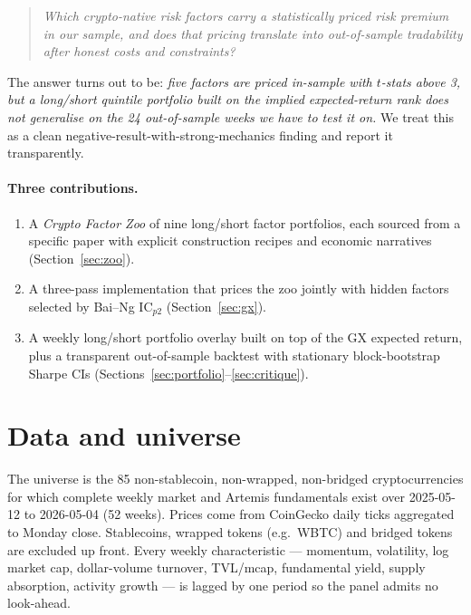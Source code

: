 \documentclass[11pt,a4paper]{article}
\begin{document}
\begin{quote}
\emph{Which crypto-native risk factors carry a statistically priced risk premium in our sample, and does that pricing translate into out-of-sample tradability after honest costs and constraints?}
\end{quote}

The answer turns out to be: \emph{five factors are priced in-sample with $t$-stats above 3, but a long/short quintile portfolio built on the implied expected-return rank does not generalise on the 24 out-of-sample weeks we have to test it on.} We treat this as a clean negative-result-with-strong-mechanics finding and report it transparently.

\paragraph{Three contributions.}
\begin{enumerate}[topsep=2pt,itemsep=0pt]
\item A \emph{Crypto Factor Zoo} of nine long/short factor portfolios, each sourced from a specific paper with explicit construction recipes and economic narratives (Section~\ref{sec:zoo}).
\item A \citet{giglioxiu2021} three-pass implementation that prices the zoo jointly with hidden factors selected by Bai--Ng IC$_{p2}$ (Section~\ref{sec:gx}).
\item A weekly long/short portfolio overlay built on top of the GX expected return, plus a transparent out-of-sample backtest with stationary block-bootstrap Sharpe CIs (Sections~\ref{sec:portfolio}--\ref{sec:critique}).
\end{enumerate}

\section{Data and universe}\label{sec:data}

The universe is the 85 non-stablecoin, non-wrapped, non-bridged cryptocurrencies for which complete weekly market and Artemis fundamentals exist over 2025-05-12 to 2026-05-04 (52 weeks). Prices come from CoinGecko daily ticks aggregated to Monday close. Stablecoins, wrapped tokens (e.g.\ WBTC) and bridged tokens are excluded up front. Every weekly characteristic --- momentum, volatility, log market cap, dollar-volume turnover, TVL/mcap, fundamental yield, supply absorption, activity growth --- is lagged by one period so the panel admits no look-ahead.
\end{document}
